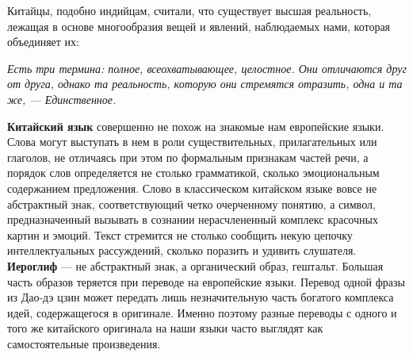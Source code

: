\documentclass[twoside,a4paper]{article}
\begin{document}
{
Китайцы, подобно индийцам, считали, что существует высшая реальность, лежащая в основе многообразия вещей и явлений,
наблюдаемых нами, которая объединяет их:}

{\itshape
{\textquotedbl}Есть три термина: {\textquotedbl}полное{\textquotedbl}, {\textquotedbl}всеохватывающее{\textquotedbl},
{\textquotedbl}целостное{\textquotedbl}. Они отличаются друг от друга, однако та реальность, которую они стремятся
отразить, одна и та же, — Единственное{\textquotedbl}.}

{
\textbf{Китайский язык} совершенно не похож на знакомые нам европейские языки. {\textquotedbl}Слова{\textquotedbl} могут
выступать в нем в роли существительных, прилагательных или глаголов, не отличаясь при этом по формальным признакам
частей речи, а порядок {\textquotedbl}слов{\textquotedbl} определяется не столько грамматикой, сколько эмоциональным
содержанием предложения. Слово в классическом китайском языке вовсе не абстрактный знак, соответствующий четко
очерченному понятию, а символ, предназначенный вызывать в сознании нерасчлененный комплекс красочных картин и эмоций.
Текст стремится не столько сообщить некую цепочку интеллектуальных рассуждений, сколько поразить и удивить слушателя.
\textbf{Иероглиф} — не абстрактный знак, а органический образ, {\textquotedbl}гештальт{\textquotedbl}. Большая часть
образов теряется при переводе на европейские языки. Перевод одной фразы из {\textquotedbl}Дао-дэ цзин{\textquotedbl}
может передать лишь незначительную часть богатого комплекса идей, содержащегося в оригинале. Именно поэтому разные
переводы с одного и того же китайского оригинала на {\textquotedbl}наши языки{\textquotedbl} часто выглядят как
самостоятельные произведения. }
\end{document}
